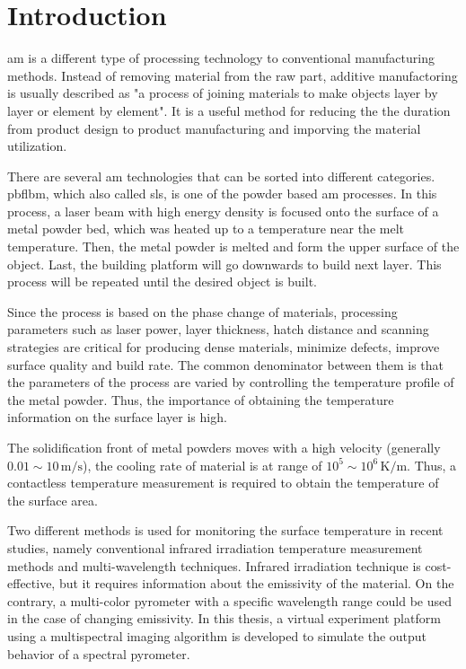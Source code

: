 \glsresetall%
\chapter{Introduction}%

\gls{am} is a different type of processing technology to conventional 
manufacturing methods. Instead of removing material from the raw part, 
additive manufactoring is usually described as "a process of joining materials
to make objects layer by layer or element by element"\cite{Frazier.2014}.
It is a useful method for reducing the the duration from product design 
to product manufacturing and imporving the material 
utilization\cite{Swift.2013b}. 


There are several \gls{am} technologies that can be sorted into different 
categories. \gls{pbflbm}, which also called \gls{sls}, is one of the powder 
based \gls{am} processes\cite{Kruth.1991}. In this process, a laser beam 
with high energy density is focused onto the surface of a metal powder bed, 
which was heated up to a temperature near the melt temperature. Then, the 
metal powder is melted and form the upper surface of the object. Last, the 
building platform will go downwards to build next layer. This process will be 
repeated until the desired object is built\cite{RevillaLeon.2019}.


Since the process is based on the phase change of materials, processing parameters 
such as laser power, layer thickness, hatch distance and scanning strategies 
are critical for producing dense materials, minimize defects, improve 
surface quality and build rate\cite{Oliveira.2020}. The common 
denominator between them is that the parameters of the process 
are varied by controlling the temperature profile of the metal powder\cite{Swift.2013b}. 
Thus, the importance of obtaining the temperature information on 
the surface layer is high. 


The solidification front of metal powders moves with a high velocity (generally 
$0.01 \sim 10 \, \text{m/s}$)\cite{DebRoy.2018}, the cooling rate of material 
is at range of $10^5 \sim 10^6 \, \text{K/m}$\cite{Oliveira.2020}. 
Thus, a contactless temperature measurement is required to obtain the temperature 
of the surface area. 


Two different methods is used for monitoring the surface temperature 
in recent studies, namely conventional infrared irradiation 
temperature measurement methods and multi-wavelength techniques\cite{Li.2019}.
Infrared irradiation technique is cost-effective, but it requires information 
about the emissivity of the material\cite{Hagqvist.2013}. On the contrary, a multi-color 
pyrometer with a specific wavelength range could be used in the case of changing 
emissivity\cite{Pixner.2021}. In this thesis, a virtual experiment platform 
using a multispectral imaging algorithm 
is developed to simulate the output behavior of a spectral pyrometer.


